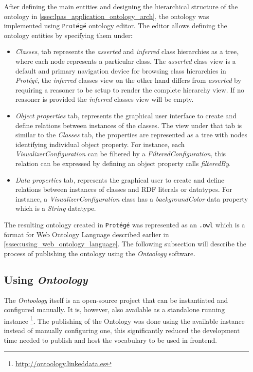 After defining the main entities and designing the hierarchical structure of the ontology in \autoref{ssec:lpas_application_ontology_arch}, the ontology was implemented using \texttt{Protégé} ontology editor. The editor allows defining the ontology entities by specifying them under:
\begin{itemize}
    \item \textit{Classes}, tab represents the \textit{asserted} and \textit{inferred} class hierarchies as a tree, where each node represents a particular class. The \textit{asserted} class view is a default and primary navigation device for browsing class hierarchies in \textit{Protégé}, the \textit{inferred} classes view on the other hand differs from \textit{asserted} by requiring a reasoner to be setup to render the complete hierarchy view. If no reasoner is provided the \textit{inferred} classes view will be empty.
    \item \textit{Object properties} tab,  represents the graphical user interface to create and define relations between instances of the classes. The view under that tab is similar to the \textit{Classes} tab, the properties are represented as a tree with nodes identifying individual object property. For instance, each \textit{VisualizerConfiguration} can be filtered by a \textit{FilteredConfiguration}, this relation can be expressed by defining an object property calls \textit{filteredBy}.
    \item \textit{Data properties} tab, represents the graphical user to create and define relations between instances of classes and RDF literals or datatypes. For instance, a \textit{VisualizerConfiguration} class has a \textit{backgroundColor} data property which is a \textit{String} datatype. 
\end{itemize}

The resulting ontology created in \texttt{Protégé} was represented as an \texttt{.owl} which is a format for Web Ontology Language described earlier in \autoref{sssec:using_web_ontology_language}. The following subsection will describe the process of publishing the ontology using the \textit{Ontoology} software. 

\subsection{Using \textit{Ontoology}}

The \textit{Ontoology} itself is an open-source project that can be instantiated and configured manually. It is, however, also available as a standalone running instance \footnote{\url{http://ontoology.linkeddata.es}}. The publishing of the \lpas{} Ontology was done using the available instance instead of manually configuring one, this significantly reduced the development time needed to publish and host the vocabulary to be used in \lpa{} frontend.

